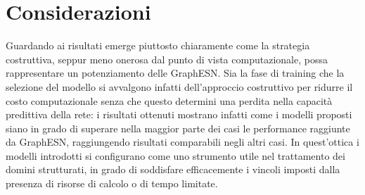 \section{Considerazioni}\label{sec:esperiment:considerazioni}
Guardando ai risultati emerge piuttosto chiaramente come la strategia costruttiva, seppur meno onerosa dal punto di vista computazionale, possa rappresentare un potenziamento delle GraphESN. Sia la fase di training che la selezione del modello si avvalgono infatti dell'approccio costruttivo per ridurre il costo computazionale senza che questo determini una perdita nella capacità predittiva della rete: i risultati ottenuti mostrano infatti come i modelli proposti siano in grado di superare nella maggior parte dei casi le performance raggiunte da GraphESN, raggiungendo risultati comparabili negli altri casi. In quest'ottica i modelli introdotti si configurano come uno strumento utile nel trattamento dei domini strutturati, in grado di soddisfare efficacemente i vincoli imposti dalla presenza di risorse di calcolo o di tempo limitate.


